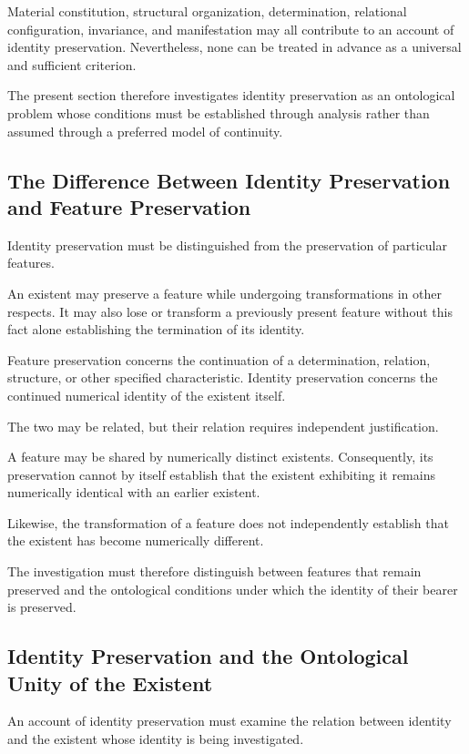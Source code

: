 Material constitution, structural organization,
determination, relational configuration, invariance,
and manifestation may all contribute to an account
of identity preservation. Nevertheless, none can
be treated in advance as a universal and sufficient
criterion.

The present section therefore investigates identity
preservation as an ontological problem whose conditions
must be established through analysis rather than
assumed through a preferred model of continuity.

\subsection{The Difference Between Identity Preservation and Feature Preservation}

Identity preservation must be distinguished from
the preservation of particular features.

An existent may preserve a feature while undergoing
transformations in other respects. It may also lose
or transform a previously present feature without
this fact alone establishing the termination of
its identity.

Feature preservation concerns the continuation
of a determination, relation, structure, or other
specified characteristic. Identity preservation
concerns the continued numerical identity of the
existent itself.

The two may be related, but their relation requires
independent justification.

A feature may be shared by numerically distinct
existents. Consequently, its preservation cannot
by itself establish that the existent exhibiting
it remains numerically identical with an earlier
existent.

Likewise, the transformation of a feature does
not independently establish that the existent
has become numerically different.

The investigation must therefore distinguish between
features that remain preserved and the ontological
conditions under which the identity of their bearer
is preserved.

\subsection{Identity Preservation and the Ontological Unity of the Existent}

An account of identity preservation must examine
the relation between identity and the existent
whose identity is being investigated.

